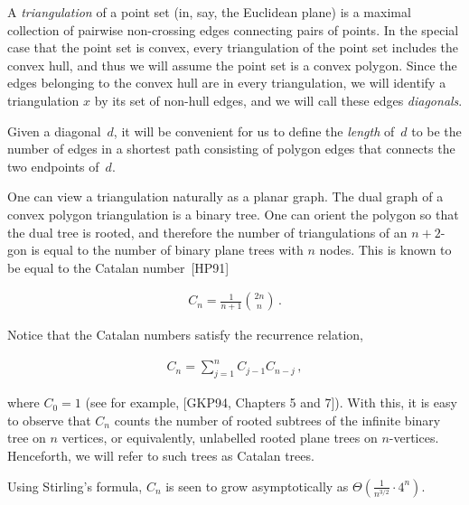 A \emph{triangulation} of a point set (in, say, the Euclidean plane) is a maximal collection of pairwise non-crossing edges connecting pairs of points. In the special case that the point set is convex, every triangulation of the point set includes the convex hull, and thus we will assume the point set is a convex polygon. Since the edges belonging to the convex hull are in every triangulation, we will identify a triangulation $x$ by its set of non-hull edges, and we will call these edges \emph{diagonals}.\par




Given a diagonal $d$, it will be convenient for us to define the \emph{length} of $d$ to be the number of edges in a shortest path consisting of polygon edges that connects the two endpoints of $d$.\par




One can view a triangulation naturally as a planar graph. The dual graph of a convex polygon triangulation is a binary tree. One can orient the polygon so that the dual tree is rooted, and therefore the number of triangulations of an $n+2$-gon is equal to the number of binary plane trees with $n$ nodes. This is known to be equal to the Catalan number [HP91]\par




\[\begin{gathered}
C_{n}=\frac{1}{n+1}\binom{2n}{n}\,.
\end{gathered}\]




Notice that the Catalan numbers satisfy the recurrence relation,\par


\[\begin{gathered}
C_{n}=\sum_{j=1}^{n}C_{j-1}C_{n-j}\,,
\end{gathered}\]


where $C_{0}=1$ (see for example, [GKP94, Chapters 5 and 7]). With this, it is easy to observe that $C_{n}$ counts the number of rooted subtrees of the infinite binary tree on $n$ vertices, or equivalently, unlabelled rooted plane trees on $n$-vertices. Henceforth, we will refer to such trees as Catalan trees.\par




Using Stirling’s formula, $C_{n}$ is seen to grow asymptotically as $\Theta\left(\frac{1}{n^{3/2}}\cdot 4^{n}\right)$.\par




